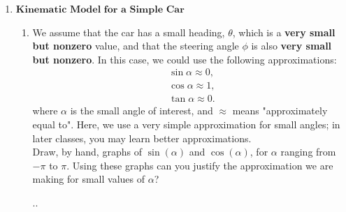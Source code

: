 \documentclass[11pt]{article}
\begin{document}
\begin{enumerate}
   \newpage
   \item $\textbf{Kinematic Model for a Simple Car}$
   \begin{enumerate}
       \item We assume that the car has a small heading, $\theta$, which is a \textbf{very small but nonzero }value, and that the steering angle $\phi$ is also \textbf{very small but nonzero}. In this case, we could use the following approximations:
        \begin{gather*}
            \sin{\alpha} \approx 0,
            \\
            \cos{\alpha} \approx 1,
            \\
            \tan{\alpha} \approx 0.
        \end{gather*}
        where $\alpha$ is the small angle of interest, and $\approx$ means "approximately equal to". Here, we use a very simple approximation for small angles; in later classes, you may learn better approximations. 
        \\
        Draw, by hand, graphs of $\sin(\alpha)$ and $\cos(\alpha)$, for $\alpha$ ranging from $-\pi$ to $\pi$. Using these graphs can you justify the approximation we are making for small values of $\alpha$?
        \begin{Answer}
            ..
        \end{Answer}

        
        
        
        
        

\end{enumerate}
\end{enumerate}
\end{document}
